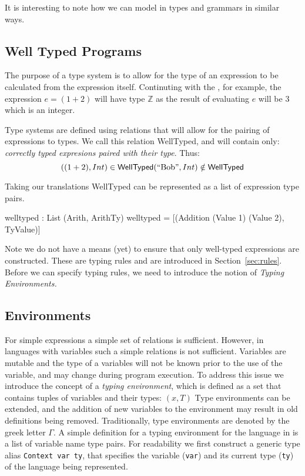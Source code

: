 \noindent
It is interesting to note how we can model in \idris{} types and grammars in similar ways.

\subsection{Well Typed Programs}
\label{sec:types:well-typed}


The purpose of a type system is to allow for the type of an expression to be calculated from the expression itself.
Continuting with the \allang{}, for example, the expression $e=(1 + 2)$ will have type $\mathbb{Z}$ as the result of evaluating $e$ will be $3$ which is an integer.

Type systems are defined using relations that will allow for the pairing of expressions to types.
We call this relation \textsf{WellTyped}, and will contain only: \emph{correctly typed expresions paired with their type}.
Thus:
\[
((1+2), Int)\in\mathsf{WellTyped}\\
(\text{``Bob''},Int)\notin\mathsf{WellTyped}
\]

\noindent
Taking our \idris{} translations \textsf{WellTyped} can be represented as a list of expression type pairs.

\begin{code}
welltyped : List (Arith, ArithTy)
welltyped = [(Addition (Value 1) (Value 2), TyValue)]
\end{code}

\noindent
Note we do not have a means (yet) to ensure that only well-typed expressions are constructed.
These are typing rules and are introduced in Section~\ref{sec:rules}.
Before we can specify typing rules, we need to introduce the notion of \emph{Typing Environments.}

\subsection{Environments}
\label{sec:type:env}

For simple expressions a simple set of relations is sufficient.
However, in languages with variables such a simple relations is not sufficient.
Variables are mutable and the type of a variables will not be known prior to the use of the variable, and may change during program execution.
To address this issue we introduce the concept of a \emph{typing environment}, which is defined as a set that contains tuples of variables and their types: $(x,T)$
Type environments can be extended, and the addition of new variables to the environment may result in old definitions being removed.
Traditionally, type environments are denoted by the greek letter $\Gamma$.
A simple definition for a typing environment for the \allang{} language in \idris{} is a list of variable name type pairs.
For readability we first construct a generic type alias \texttt{Context var ty}, that specifies the variable  (\texttt{var}) and its current type (\texttt{ty}) of the language being represented.

